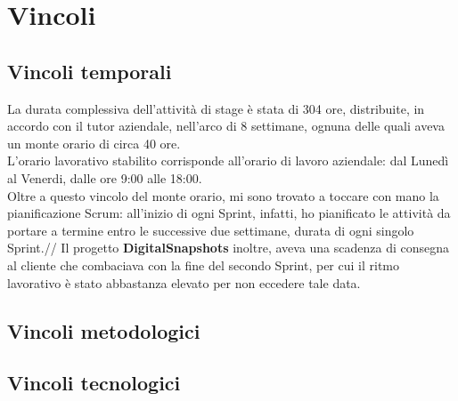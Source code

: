 \section{Vincoli}
\subsection{Vincoli temporali}

La durata complessiva dell'attività di stage è stata di 304 ore, distribuite, in accordo con il tutor aziendale, nell'arco di 8 settimane, ognuna delle quali aveva un monte orario di circa 40 ore. \\
L'orario lavorativo stabilito corrisponde all'orario di lavoro aziendale: dal Lunedì al Venerdi, dalle ore 9:00 alle 18:00.\\
Oltre a questo vincolo del monte orario, mi sono trovato a toccare con mano la pianificazione Scrum: all'inizio di ogni Sprint, infatti, ho pianificato le attività da portare a termine entro le successive due settimane, durata di ogni singolo Sprint.//
Il progetto \textbf{DigitalSnapshots} inoltre, aveva una scadenza di consegna al cliente che combaciava con la fine del secondo Sprint, per cui il ritmo lavorativo è stato abbastanza elevato per non eccedere tale data.

\subsection{Vincoli metodologici}
\subsection{Vincoli tecnologici}

